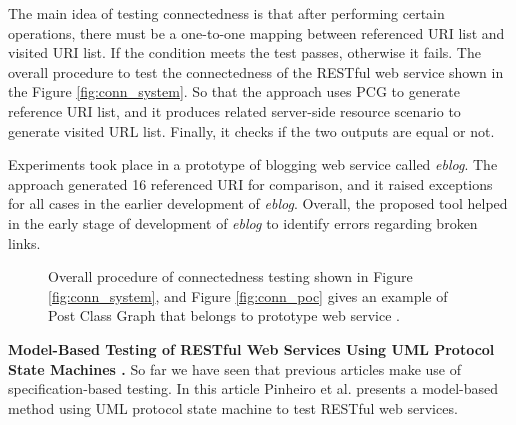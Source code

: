 \documentclass[english]{tktltiki}
\begin{document}
The main idea of testing connectedness is that after performing certain operations, there must be a one-to-one mapping between referenced URI list and visited URI list. If the condition meets the test passes, otherwise it fails. The overall procedure to test the connectedness of the RESTful web service shown in the Figure \ref{fig:conn_system}. So that the approach uses PCG to generate reference URI list, and it produces related server-side resource scenario to generate visited URL list. Finally, it checks if the two outputs are equal or not.

Experiments took place in a prototype of blogging web service called \textit{eblog}. The approach generated 16 referenced URI for comparison, and it raised exceptions for all cases in the earlier development of \textit{eblog}. Overall, the proposed tool helped in the early stage of development of \textit{eblog} to identify errors regarding broken links.
\begin{figure}[h]
	\centering
	\hfill%
	\caption{Overall procedure of connectedness testing shown in Figure \ref{fig:conn_system}, and Figure \ref{fig:conn_poc} gives an example of Post Class Graph that belongs to prototype web service \cite{chakrabarti2010connectedness}.}
\end{figure}

\textbf{Model-Based Testing of RESTful Web Services Using UML Protocol State Machines \cite{pinheiro2013model}.} So far we have seen that previous articles make use of specification-based testing. In this article Pinheiro et al. \cite{pinheiro2013model} presents a model-based method using UML protocol state machine to test RESTful web services. 
\end{document}

